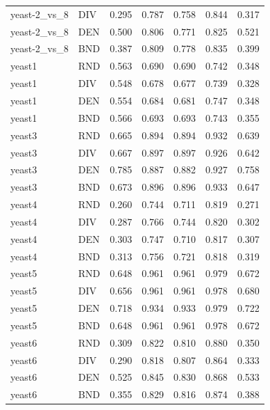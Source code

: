 \documentclass[10pt,a4paper]{article}
\begin{document}
\begin{longtable}{lllllrr}
yeast-2\_vs\_8 & DIV & 0.295 & 0.787 & 0.758 & 0.844 & 0.317 \\
yeast-2\_vs\_8 & DEN & 0.500 & 0.806 & 0.771 & 0.825 & 0.521 \\
yeast-2\_vs\_8 & BND & 0.387 & 0.809 & 0.778 & 0.835 & 0.399 \\
yeast1 & RND & 0.563 & 0.690 & 0.690 & 0.742 & 0.348 \\
yeast1 & DIV & 0.548 & 0.678 & 0.677 & 0.739 & 0.328 \\
yeast1 & DEN & 0.554 & 0.684 & 0.681 & 0.747 & 0.348 \\
yeast1 & BND & 0.566 & 0.693 & 0.693 & 0.743 & 0.355 \\
yeast3 & RND & 0.665 & 0.894 & 0.894 & 0.932 & 0.639 \\
yeast3 & DIV & 0.667 & 0.897 & 0.897 & 0.926 & 0.642 \\
yeast3 & DEN & 0.785 & 0.887 & 0.882 & 0.927 & 0.758 \\
yeast3 & BND & 0.673 & 0.896 & 0.896 & 0.933 & 0.647 \\
yeast4 & RND & 0.260 & 0.744 & 0.711 & 0.819 & 0.271 \\
yeast4 & DIV & 0.287 & 0.766 & 0.744 & 0.820 & 0.302 \\
yeast4 & DEN & 0.303 & 0.747 & 0.710 & 0.817 & 0.307 \\
yeast4 & BND & 0.313 & 0.756 & 0.721 & 0.818 & 0.319 \\
yeast5 & RND & 0.648 & 0.961 & 0.961 & 0.979 & 0.672 \\
yeast5 & DIV & 0.656 & 0.961 & 0.961 & 0.978 & 0.680 \\
yeast5 & DEN & 0.718 & 0.934 & 0.933 & 0.979 & 0.722 \\
yeast5 & BND & 0.648 & 0.961 & 0.961 & 0.978 & 0.672 \\
yeast6 & RND & 0.309 & 0.822 & 0.810 & 0.880 & 0.350 \\
yeast6 & DIV & 0.290 & 0.818 & 0.807 & 0.864 & 0.333 \\
yeast6 & DEN & 0.525 & 0.845 & 0.830 & 0.868 & 0.533 \\
yeast6 & BND & 0.355 & 0.829 & 0.816 & 0.874 & 0.388 \\
\end{longtable}
\endgroup
\clearpage
\end{document}
